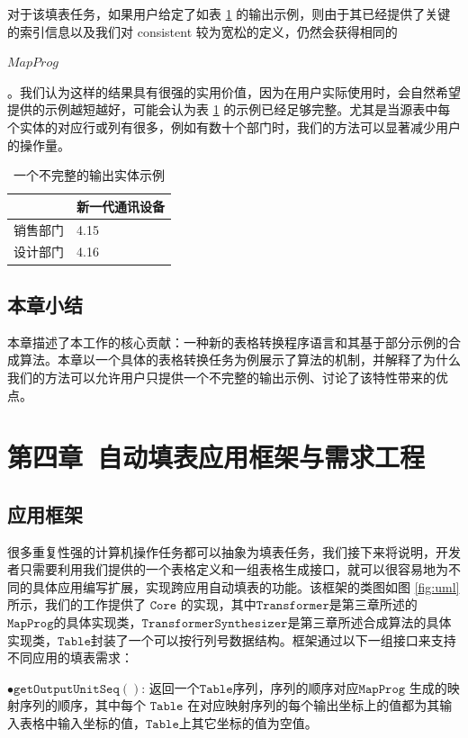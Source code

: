\documentclass[design, pageheader]{njubachelor}
\begin{document}
对于该填表任务，如果用户给定了如表 \ref{table:example_target_partial_example} 的输出示例，则由于其已经提供了关键的索引信息以及我们对 consistent 较为宽松的定义，仍然会获得相同的 \begin{ttmath}$MapProg$\end{ttmath}。我们认为这样的结果具有很强的实用价值，因为在用户实际使用时，会自然希望提供的示例越短越好，可能会认为表 \ref{table:example_target_partial_example} 的示例已经足够完整。尤其是当源表中每个实体的对应行或列有很多，例如有数十个部门时，我们的方法可以显著减少用户的操作量。
\begin{table}[!htbp] 
    \centering   
    \begin{tabular}{|l|l|}
    \hline
     & 新一代通讯设备 \\ \hline
    销售部门   & 4.15      \\ \hline
    设计部门   & 4.16   \\ \hline
    \end{tabular}
    \caption{一个不完整的输出实体示例}
    \label{table:example_target_partial_example}
\end{table}

\subsection{本章小结}
本章描述了本工作的核心贡献：一种新的表格转换程序语言和其基于部分示例的合成算法。本章以一个具体的表格转换任务为例展示了算法的机制，并解释了为什么我们的方法可以允许用户只提供一个不完整的输出示例、讨论了该特性带来的优点。

\section{第四章~自动填表应用框架与需求工程}
\subsection{应用框架}
很多重复性强的计算机操作任务都可以抽象为填表任务，我们接下来将说明，开发者只需要利用我们提供的一个表格定义和一组表格生成接口，就可以很容易地为不同的具体应用编写扩展，实现跨应用自动填表的功能。该框架的类图如图 \ref{fig:uml} 所示，我们的工作提供了 $\mathtt{Core}$ 的实现，其中$\mathtt{Transformer}$是第三章所述的$\mathtt{MapProg}$的具体实现类，$\mathtt{TransformerSynthesizer}$是第三章所述合成算法的具体实现类，$\mathtt{Table}$封装了一个可以按行列号数据结构。框架通过以下一组接口来支持不同应用的填表需求：

$\bullet \mathtt{getOutputUnitSeq()}$: 返回一个$\mathtt{Table}$序列，序列的顺序对应$\mathtt{MapProg}$ 生成的映射序列的顺序，其中每个 $\mathtt{Table}$ 在对应映射序列的每个输出坐标上的值都为其输入表格中输入坐标的值，$\mathtt{Table}$上其它坐标的值为空值。 
\end{document}

